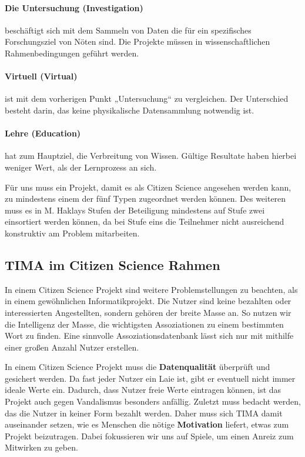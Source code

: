 \paragraph{Die Untersuchung (Investigation)} beschäftigt sich mit dem Sammeln von Daten die für ein spezifisches Forschungsziel von Nöten sind. Die Projekte müssen in wissenschaftlichen Rahmenbedingungen geführt werden.

\paragraph{Virtuell (Virtual)} ist mit dem vorherigen Punkt „Untersuchung“ zu vergleichen. Der Unterschied besteht darin, das keine physikalische Datensammlung notwendig ist.

\paragraph{Lehre (Education)} hat zum Hauptziel, die Verbreitung von Wissen. Gültige Resultate haben hierbei weniger Wert, als der Lernprozess an sich.
 
Für uns muss ein Projekt, damit es als Citizen Science angesehen werden kann, zu mindestens einem der fünf Typen zugeordnet werden können. Des weiteren muss es in M. Haklays Stufen der Beteiligung mindestens auf Stufe zwei einsortiert werden können, da bei Stufe eins die Teilnehmer nicht ausreichend konstruktiv am Problem mitarbeiten.

\subsection{TIMA im Citizen Science Rahmen}
In einem Citizen Science Projekt sind weitere Problemstellungen zu beachten, als in einem gewöhnlichen Informatikprojekt. Die Nutzer sind keine bezahlten oder interessierten Angestellten, sondern gehören der breite Masse an. So nutzen wir die Intelligenz der Masse, die wichtigsten Assoziationen zu einem bestimmten Wort zu finden. Eine sinnvolle Assoziationsdatenbank lässt sich nur mit mithilfe einer großen Anzahl Nutzer erstellen.

In einem Citizen Science Projekt muss die \textbf{Datenqualität} überprüft und gesichert werden. Da fast jeder Nutzer ein Laie ist, gibt er eventuell nicht immer ideale Werte ein. Dadurch, dass Nutzer freie Werte eintragen können, ist das Projekt auch gegen Vandalismus besonders anfällig. Zuletzt muss bedacht werden, das die Nutzer in keiner Form bezahlt werden. Daher muss sich TIMA damit auseinander setzen, wie es Menschen die nötige \textbf{Motivation} liefert, etwas zum Projekt beizutragen. Dabei fokussieren wir uns auf Spiele, um einen Anreiz zum Mitwirken zu geben.


